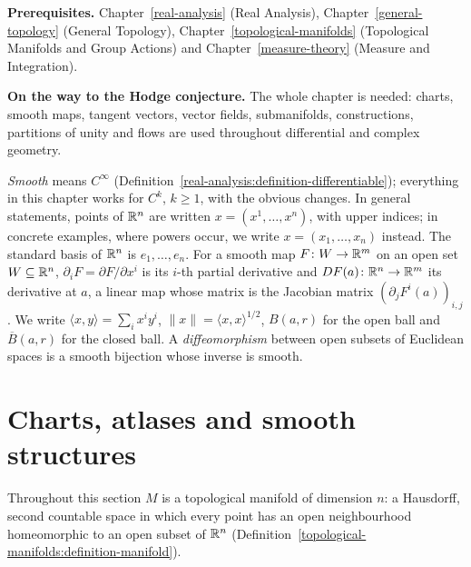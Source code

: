 \noindent\textbf{Prerequisites.} Chapter~\ref{real-analysis} (Real Analysis), Chapter~\ref{general-topology} (General Topology),
Chapter~\ref{topological-manifolds} (Topological Manifolds and Group Actions) and
Chapter~\ref{measure-theory} (Measure and Integration).

\noindent\textbf{On the way to the Hodge conjecture.} The whole chapter is needed: charts, smooth maps, tangent vectors, vector fields, submanifolds, constructions, partitions of unity and
flows are used throughout differential and complex geometry.

\begin{notation}\label{smooth-manifolds:notation-conventions}
\emph{Smooth} means $C^\infty$ (Definition~\ref{real-analysis:definition-differentiable}); everything in this chapter works for $C^k$, $k \geq 1$, with the
obvious changes. In general statements, points of $\mathbb{R}^n$ are written $x = (x^1, \ldots, x^n)$, with upper indices; in concrete examples, where powers
occur, we write $x = (x_1, \ldots, x_n)$ instead. The standard basis of $\mathbb{R}^n$ is $e_1, \ldots, e_n$. For a smooth map $F \colon W \to \mathbb{R}^m$ on an open set
$W \subseteq \mathbb{R}^n$, $\partial_iF = \partial F/\partial x^i$ is its $i$-th partial derivative and $DF(a) \colon \mathbb{R}^n \to \mathbb{R}^m$ its derivative at $a$, a linear
map whose matrix is the Jacobian matrix $(\partial_jF^i(a))_{i,j}$. We write $\langle x, y\rangle = \sum_ix^iy^i$, $\|x\| = \langle x, x\rangle^{1/2}$,
$B(a, r)$ for the open ball and $\overline{B}(a, r)$ for the closed ball. A \emph{diffeomorphism} between open subsets of Euclidean spaces is a smooth bijection
whose inverse is smooth.
\end{notation}

\section{Charts, atlases and smooth structures}\label{smooth-manifolds:section-manifolds}

Throughout this section $M$ is a topological manifold of dimension $n$: a Hausdorff, second countable space in which every point has an open neighbourhood
homeomorphic to an open subset of $\mathbb{R}^n$ (Definition~\ref{topological-manifolds:definition-manifold}).

